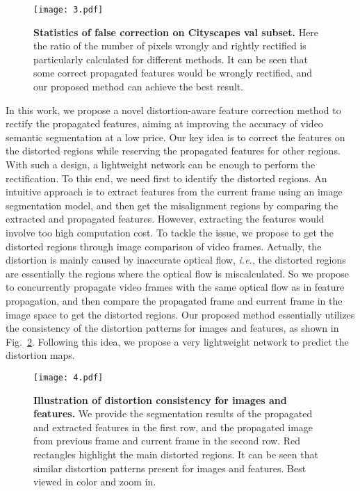\documentclass[journal]{IEEEtran}
\begin{document}
\begin{figure}[t]
	\begin{center}
		\texttt{[image: 3.pdf]}
	\end{center}
	\caption{\textbf{Statistics of false correction on Cityscapes val subset.} Here the ratio of the number of pixels wrongly and rightly rectified is particularly calculated for different methods. It can be seen that some correct propagated features would be wrongly rectified, and our proposed method can achieve the best result.  }
	\label{exp_correct_error}
\end{figure}

In this work, we propose a novel distortion-aware feature correction method to rectify the propagated features, aiming at improving the accuracy of video semantic segmentation at a low price. Our key idea is to correct the features on the distorted regions while reserving the propagated features for other regions. With such a design, a lightweight network can be enough to perform the rectification. To this end, we need first to identify the distorted regions. An intuitive approach is to extract features from the current frame using an image segmentation model, and then get the misalignment regions by comparing the extracted and propagated features. However, extracting the features would involve too high computation cost. To tackle the issue, we propose to get the distorted regions through image comparison of video frames. Actually, the distortion is mainly caused by inaccurate optical flow, \textit{i.e.}, the distorted regions are essentially the regions where the optical flow is miscalculated. So we propose to concurrently propagate video frames with the same optical flow as in feature propagation, and then compare the propagated frame and current frame in the image space to get the distorted regions. Our proposed method essentially utilizes the consistency of the distortion patterns for images and features, as shown in Fig.~\ref{distortion_pattern}. Following this idea, we propose a very lightweight network to predict the distortion maps.

\begin{figure}[t]
	\begin{center}
		\texttt{[image: 4.pdf]}
	\end{center}
	\caption{\textbf{Illustration of distortion consistency for images and features.} We provide the segmentation results of the propagated and extracted features in the first row, and the propagated image from previous frame and current frame in the second row. Red rectangles highlight the main distorted regions. It can be seen that similar distortion patterns present for images and features. Best viewed in color and zoom in.}
	\label{distortion_pattern}
\end{figure}
\end{document}
